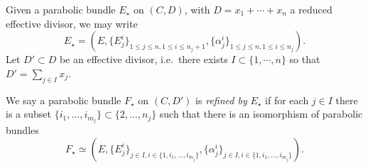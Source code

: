 \begin{definition}
\notready
	\label{definition:refinements}
	Given a parabolic bundle $E_\star$ on $(C,D)$, with $D=x_1+ \cdots+ x_n$ a reduced effective divisor, we may write $$E_\star= (E, \{E^i_j\}_{1 \leq j \leq n,
	1\leq i \leq n_j+1}, \{\alpha^i_j\}_{1 \leq j \leq n,
1\leq i \leq n_j}).$$
Let $D'\subset D$ be an effective divisor, i.e.~there exists $I\subset \{1, \cdots, n\}$ so that $D'=\sum_{j\in I} x_j$.

We say a parabolic bundle $F_\star$ on $(C, D')$ is {\em refined by} $E_\star$ if for each $j\in I$ there is a subset $\{i_1, \ldots, i_{m_j}\} \subset
\{2, \ldots, n_j\}$ such that there is an isomorphism of parabolic bundles
$$F_\star \simeq
(E, \{E^i_j\}_{j \in I, i \in \{1, i_1, \ldots, i_{m_j}\} },
\{\alpha^i_j\}_{j \in I, i \in \{1, i_1, \ldots, i_{m_j}\} }).$$
\end{definition}

